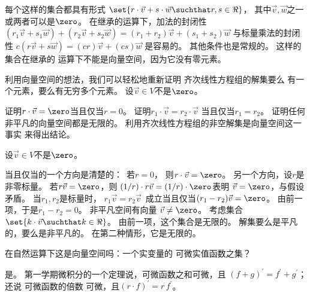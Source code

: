     \begin{answer}
     \begin{exparts}
      \partsitem 每个这样的集合都具有形式
        \( \set{r\cdot\vec{v}+s\cdot\vec{w}\suchthat r,s\in\Re} \)，
        其中\( \vec{v},\vec{w} \)之一或两者可以是\( \zero \)。
        在继承的运算下，加法的封闭性
        \( (r_1\vec{v}+s_1\vec{w})+(r_2\vec{v}+s_2\vec{w})
           =(r_1+r_2)\vec{v}+(s_1+s_2)\vec{w} \)
        与标量乘法的封闭性
        \( c(r\vec{v}+s\vec{w})=(cr)\vec{v}+(cs)\vec{w} \)
        是容易的。
        其他条件也是常规的。
      \partsitem 这样的集合在继承的
        运算下不能是向量空间，因为它没有零元素。
     \end{exparts}  
    \end{answer}
  \item 
    利用向量空间的想法，我们可以轻松地重新证明
    齐次线性方程组的解集要么
    有一个元素，要么有无穷多个元素。 
    设\( \vec{v}\in V \)不是\( \zero \)。
    \begin{exparts}
      \partsitem 证明\( r\cdot\vec{v}=\zero \)当且仅当\( r=0 \)。
      \partsitem 证明\( r_1\cdot\vec{v}=r_2\cdot\vec{v} \)
      当且仅当\( r_1=r_2 \)。
      \partsitem 证明任何非平凡的向量空间都是无限的。
      \partsitem 利用齐次线性方程组的非空解集是向量空间这一事实
        来得出结论。
    \end{exparts}
    \begin{answer}
      设\( \vec{v}\in V \)不是\( \zero \)。
      \begin{exparts}
        \partsitem 当且仅当的一个方向是清楚的：~若$r=0$，
          则$r\cdot\vec{v}=\zero$。
          另一个方向，设\( r \)是非零标量。
          若\( r\vec{v}=\zero \)，则
          \( (1/r)\cdot r\vec{v}=(1/r)\cdot \zero \)表明
          $\vec{v}=\zero$，与假设矛盾。
        \partsitem 当\( r_1,r_2 \)是标量时， 
          \( r_1\vec{v}=r_2\vec{v}\, \)
          成立当且仅当\( (r_1-r_2)\vec{v}=\zero \)。
          由前一项，于是\( r_1-r_2=0 \)。
        \partsitem 非平凡空间有向量 
          \( \vec{v}\neq\zero \)。
          考虑集合\( \set{k\cdot\vec{v}\suchthat k\in\Re} \)。
          由前一项，这个集合是无限的。
        \partsitem 解集要么是平凡的，要么是非平凡的。
          在第二种情形，它是无限的。   
     \end{exparts}  
    \end{answer}
  \item 
    在自然运算下这是向量空间吗：一个实变量的
    可微实值函数之集？
    \begin{answer}
      是。
      第一学期微积分的一个定理说，可微函数之和可微，且
      \( (f+g)^\prime=f^\prime+g^\prime \)；还说 
      可微函数的倍数
      可微，且\( (r\cdot f)^\prime=r\,f^\prime \)。 
    \end{answer}
